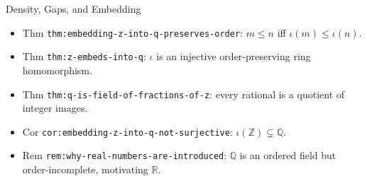 \begin{topicbox}{Density, Gaps, and Embedding}
\begin{itemize}
  \item Thm \texttt{thm:embedding-z-into-q-preserves-order}: $m\le n$ iff $\iota(m)\le\iota(n)$.
  \item Thm \texttt{thm:z-embeds-into-q}: $\iota$ is an injective order-preserving ring homomorphism.
  \item Thm \texttt{thm:q-is-field-of-fractions-of-z}: every rational is a quotient of integer images.
  \item Cor \texttt{cor:embedding-z-into-q-not-surjective}: $\iota(\mathbb{Z})\subsetneq\mathbb{Q}$.
  \item Rem \texttt{rem:why-real-numbers-are-introduced}: $\mathbb{Q}$ is an ordered field but order-incomplete, motivating $\mathbb{R}$.
\end{itemize}
\end{topicbox}
